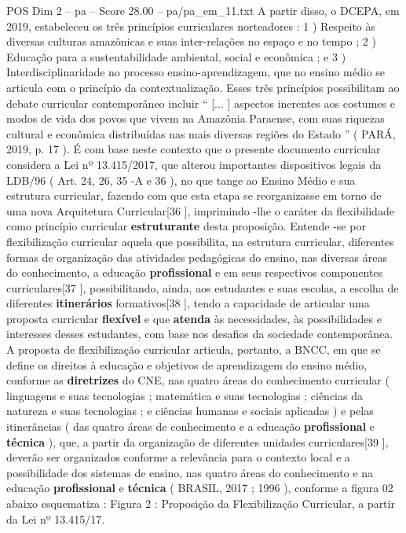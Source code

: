 \begin{textsample}{POS Dim 2 – pa – Score 28.00 – pa/pa\_em\_11.txt}
A partir disso, o DCEPA, em 2019, estabeleceu os três princípios curriculares norteadores : 1 ) Respeito às diversas culturas amazônicas e suas inter-relações no espaço e no tempo ; 2 ) Educação para a sustentabilidade ambiental, social e econômica ; e 3 ) Interdisciplinaridade no processo ensino-aprendizagem, que no ensino médio se articula com o princípio da contextualização.
Esses três princípios possibilitam ao debate curricular contemporâneo incluir “ [... ] aspectos inerentes aos costumes e modos de vida dos povos que vivem na Amazônia Paraense, com suas riquezas cultural e econômica distribuídas nas mais diversas regiões do Estado ” ( PARÁ, 2019, p. 17 ).
É com base neste contexto que o presente documento curricular considera a Lei nº 13.415/2017, que alterou importantes dispositivos legais da LDB/96 ( Art. 24, 26, 35 -A e 36 ), no que tange ao Ensino Médio e sua estrutura curricular, fazendo com que esta etapa se reorganizasse em torno de uma nova Arquitetura Curricular[36 ], imprimindo -lhe o caráter da flexibilidade como princípio curricular \textbf{estruturante} desta proposição.
Entende -se por flexibilização curricular aquela que possibilita, na estrutura curricular, diferentes formas de organização das atividades pedagógicas do ensino, nas diversas áreas do conhecimento, a educação \textbf{profissional} e em seus respectivos componentes curriculares[37 ], possibilitando, ainda, aos estudantes e suas escolas, a escolha de diferentes \textbf{itinerários} formativos[38 ], tendo a capacidade de articular uma proposta curricular \textbf{flexível} e que \textbf{atenda} às necessidades, às possibilidades e interesses desses estudantes, com base nos desafios da sociedade contemporânea.
A proposta de flexibilização curricular articula, portanto, a BNCC, em que se define os direitos à educação e objetivos de aprendizagem do ensino médio, conforme as \textbf{diretrizes} do CNE, nas quatro áreas do conhecimento curricular ( linguagens e suas tecnologias ; matemática e suas tecnologias ; ciências da natureza e suas tecnologias ; e ciências humanas e sociais aplicadas ) e pelas itinerâncias ( das quatro áreas de conhecimento e a educação \textbf{profissional} e \textbf{técnica} ), que, a partir da organização de diferentes unidades curriculares[39 ], deverão ser organizados conforme a relevância para o contexto local e a possibilidade dos sistemas de ensino, nas quatro áreas do conhecimento e na educação \textbf{profissional} e \textbf{técnica} ( BRASIL, 2017 ; 1996 ), conforme a figura 02 abaixo esquematiza : Figura 2 : Proposição da Flexibilização Curricular, a partir da Lei nº 13.415/17.

\end{textsample}
